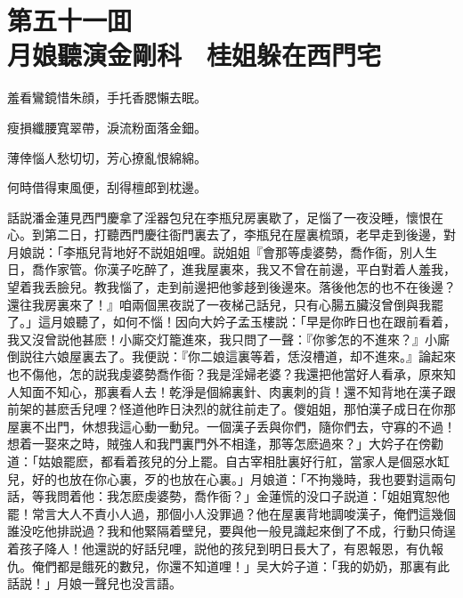 
\chapter*{第五十一囬　\\月娘聽演金剛科　桂姐躲在西門宅}
\thispagestyle{empty}

\begin{myquote}
羞看鸞鏡惜朱顔，手托香腮懶去眠。

瘦損纖腰寬翠帶，淚流粉面落金鈿。

薄倖惱人愁切切，芳心撩亂恨綿綿。

何時借得東風便，刮得檀郎到枕邊。
\end{myquote}

話説潘金蓮見西門慶拿了淫器包兒在李瓶兒房裏歇了，足惱了一夜没睡，懷恨在心。到第二日，打聽西門慶往衙門裏去了，李瓶兒在屋裏梳頭，老早走到後邊，對月娘説：「李瓶兒背地好不説姐姐哩。説姐姐『會那等虔婆勢，喬作衙，別人生日，喬作家管。你漢子吃醉了，進我屋裏來，我又不曾在前邊，平白對着人羞我，望着我丢臉兒。教我惱了，走到前邊把他爹趍到後邊來。落後他怎的也不在後邊？還往我房裏來了！』咱兩個黑夜説了一夜梯己話兒，只有心腸五臟沒曾倒與我罷了。」這月娘聽了，如何不惱！因向大妗子孟玉樓説：「早是你昨日也在跟前看着，我又沒曾説他甚麽！小廝交灯籠進來，我只問了一聲：『你爹怎的不進來？』小廝倒説往六娘屋裏去了。我便説：『你二娘這裏等着，恁沒槽道，却不進來。』論起來也不傷他，怎的説我虔婆勢喬作衙？我是淫婦老婆？我還把他當好人看承，原來知人知面不知心，那裏看人去！乾淨是個綿裏針、肉裏刺的貨！還不知背地在漢子跟前架的甚麽舌兒哩？怪道他昨日決烈的就往前走了。儍姐姐，那怕漢子成日在你那屋裏不出門，休想我這心動一動兒。一個漢子丢與你們，隨你們去，守寡的不過！想着一娶來之時，賊強人和我門裏門外不相逢，那等怎麽過來？」大妗子在傍勸道：「姑娘罷麽，都看着孩兒的分上罷。自古宰相肚裏好行舡，當家人是個惡水缸兒，好的也放在你心裏，歹的也放在心裏。」月娘道：「不拘幾時，我也要對這兩句話，等我問着他：我怎麽虔婆勢，喬作衙？」金蓮慌的没口子説道：「姐姐寬恕他罷！常言大人不責小人過，那個小人没罪過？他在屋裏背地調唆漢子，俺們這幾個誰没吃他排説過？我和他緊隔着壁兒，要與他一般見識起來倒了不成，行動只倚逞着孩子降人！他還説的好話兒哩，説他的孩兒到明日長大了，有恩報恩，有仇報仇。俺們都是餓死的數兒，你還不知道哩！」吴大妗子道：「我的奶奶，那裏有此話説！」月娘一聲兒也没言語。

